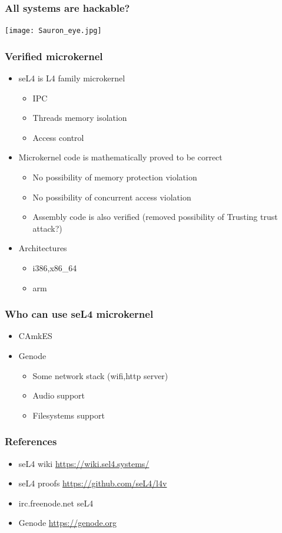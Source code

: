 \begin{frame}
  \frametitle{All systems are hackable?}
  \texttt{[image: Sauron\_eye.jpg]}
\end{frame}

\begin{frame}
  \frametitle{Verified microkernel}
  \begin{itemize}
      \item seL4 is L4 family microkernel
        \begin{itemize}
            \item IPC
            \item Threads memory isolation
            \item Access control
        \end{itemize}
      \item Microkernel code is mathematically proved to be correct
        \begin{itemize}
            \item No possibility of memory protection violation
            \item No possibility of concurrent access violation
            \item Assembly code is also verified (removed possibility of Trusting trust attack?)
        \end{itemize}
      \item Architectures
         \begin{itemize}
             \item i386,x86\_64
             \item arm 
         \end{itemize}
  \end{itemize}
\end{frame}

\begin{frame}
  \frametitle{Who can use seL4 microkernel}
  \begin{itemize}
      \item CAmkES
      \item Genode
        \begin{itemize}
          \item Some network stack (wifi,http server)
          \item Audio support
          \item Filesystems support
        \end{itemize}
  \end{itemize}
\end{frame}

\begin{frame}
  \frametitle{References}
  \begin{itemize}
    \item seL4 wiki \url{https://wiki.sel4.systems/}
    \item seL4 proofs \url{https://github.com/seL4/l4v}
    \item irc.freenode.net seL4
    \item Genode \url{https://genode.org}
  \end{itemize}
\end{frame}

